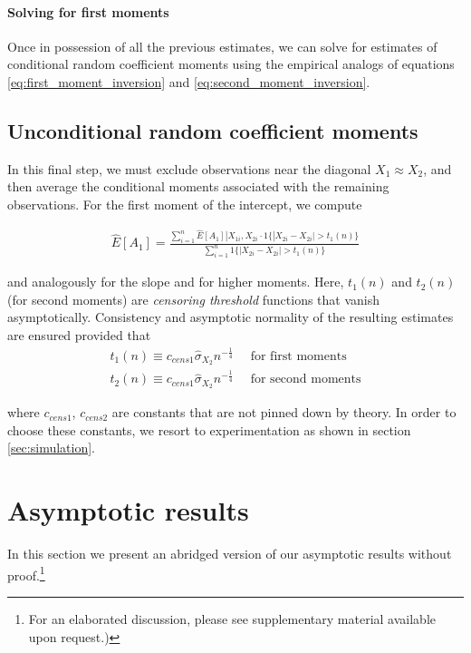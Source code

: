 \paragraph{Solving for first moments} Once in possession of all the previous estimates, we can solve for estimates of conditional random coefficient moments using the empirical analogs of equations \ref{eq:first_moment_inversion} and \ref{eq:second_moment_inversion}.
  

\subsection*{Unconditional random coefficient moments}

In this final step, we must exclude observations near the diagonal $X_1 ≈ X_2$, and then average the conditional moments associated with the remaining observations. For the first moment of the intercept, we compute 

\begin{align}
  \hat{E}[A_1] = \frac{\sum_{i=1}^{n} \hat{E}[A_1] | X_{1i}, X_{2i} \cdot 1\{ |X_{2i} - X_{2i}| > t_{1}(n) \} }
                      {\sum_{i=1}^{n} 1\{ |X_{2i} - X_{2i}| > t_1(n) \} }
\end{align}

\noindent and analogously for the slope and for higher moments. Here, $t_{1}(n)$ and $t_2(n)$ (for second moments) are \emph{censoring threshold} functions that vanish asymptotically. Consistency and asymptotic normality of the resulting estimates are ensured provided that
\begin{align}
 t_1(n) \equiv c_{cens1} \hat{\sigma}_{X_2} n^{-\frac{1}{4}} \quad \text{ for first moments}\\
 t_2(n) \equiv c_{cens1} \hat{\sigma}_{X_2} n^{-\frac{1}{4}} \quad \text{ for second moments}
\end{align}

\noindent where $c_{cens1}$, $c_{cens2}$ are constants that are not pinned down by theory. In order to choose these constants, we resort to experimentation as shown in section \ref{sec:simulation}.



\section{Asymptotic results}

In this section we present an abridged version of our asymptotic results without proof.\footnote{For an elaborated discussion, please see supplementary material available upon request.)}  

